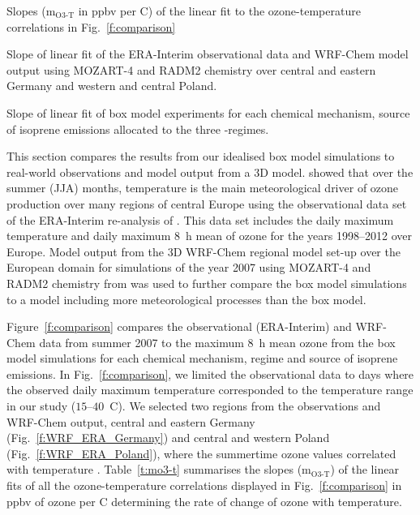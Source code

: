 \begin{table}[t]%
    \centering%
    \caption{Slopes (m$_{\text{O3-T}}$ in ppbv per \degree C) of the linear fit to the ozone-temperature correlations in Fig.~\ref{f:comparison}}%
    \label{t:mo3-t}%
    \begin{subtable}[t]{\textwidth}%
        \centering%
        \vspace{2mm}%
        \caption{Slope of linear fit of the ERA-Interim observational data and WRF-Chem model output using MOZART-4 and RADM2 chemistry over central and eastern Germany and western and central Poland.}%
        \label{t:era_wrf_o3-T}%
    \end{subtable}
    \begin{subtable}[t]{\textwidth}%
        \centering%
        \vspace{2mm}
        \caption{Slope of linear fit of box model experiments for each chemical mechanism, source of isoprene emissions allocated to the three -regimes.}%
        \label{t:boxmodel_o3-T}%
    \end{subtable}
\end{table} 

This section compares the results from our idealised box model simulations to real-world observations and model output from a 3D model.
\citet{Otero:2016} showed that over the summer (JJA) months, temperature is the main meteorological driver of ozone production over many regions of central Europe using the observational data set of the ERA-Interim re-analysis of \citet{Schnell:2015}.
This data set includes the daily maximum temperature and daily maximum 8~h mean of ozone for the years 1998--2012 over Europe.
Model output from the 3D WRF-Chem regional model set-up over the European domain for simulations of the year 2007 using MOZART-4 and RADM2 chemistry from \citet{Mar:2015} was used to further compare the box model simulations to a model including more meteorological processes than the box model.

Figure~\ref{f:comparison} compares the observational (ERA-Interim) and WRF-Chem data from summer 2007 to the maximum 8~h mean ozone from the box model simulations for each chemical mechanism,  regime and source of isoprene emissions.
In Fig.~\ref{f:comparison}, we limited the observational data to days where the observed daily maximum temperature corresponded to the temperature range in our study ($15$--$40$~\degree C).
We selected two regions from the observations and WRF-Chem output, central and eastern Germany (Fig.~\ref{f:WRF_ERA_Germany}) and central and western Poland (Fig.~\ref{f:WRF_ERA_Poland}), where the summertime ozone values correlated with temperature \citep{Otero:2016}.
Table~\ref{t:mo3-t} summarises the slopes (m$_{\text{O3-T}}$) of the linear fits of all the ozone-temperature correlations displayed in Fig.~\ref{f:comparison} in ppbv of ozone per \degree C determining the rate of change of ozone with temperature.

